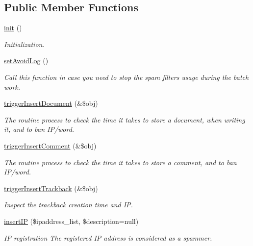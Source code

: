 \subsection*{Public Member Functions}
\begin{DoxyCompactItemize}
\item 
\hyperlink{classspamfilterController_a8204da601e789d60dbdfe0f692537e70}{init} ()
\begin{DoxyCompactList}\small\item\em Initialization. \end{DoxyCompactList}\item 
\hyperlink{classspamfilterController_a31282e59e182dca5e3f94e4c9122578d}{set\+Avoid\+Log} ()
\begin{DoxyCompactList}\small\item\em Call this function in case you need to stop the spam filter\textquotesingle{}s usage during the batch work. \end{DoxyCompactList}\item 
\hyperlink{classspamfilterController_a9ed78c37a603b06cb067ecdc523a2ae4}{trigger\+Insert\+Document} (\&\$obj)
\begin{DoxyCompactList}\small\item\em The routine process to check the time it takes to store a document, when writing it, and to ban I\+P/word. \end{DoxyCompactList}\item 
\hyperlink{classspamfilterController_ac01aa63960909cc5c95bfae15ded5d99}{trigger\+Insert\+Comment} (\&\$obj)
\begin{DoxyCompactList}\small\item\em The routine process to check the time it takes to store a comment, and to ban I\+P/word. \end{DoxyCompactList}\item 
\hyperlink{classspamfilterController_ace7cf6178aa16638526af5d73a9554eb}{trigger\+Insert\+Trackback} (\&\$obj)
\begin{DoxyCompactList}\small\item\em Inspect the trackback creation time and I\+P. \end{DoxyCompactList}\item 
\hyperlink{classspamfilterController_aab95351e0ebeffec58d24354aa92e3f5}{insert\+I\+P} (\$ipaddress\+\_\+list, \$description=null)
\begin{DoxyCompactList}\small\item\em I\+P registration The registered I\+P address is considered as a spammer. \end{DoxyCompactList}\item 

\end{DoxyCompactItemize}
